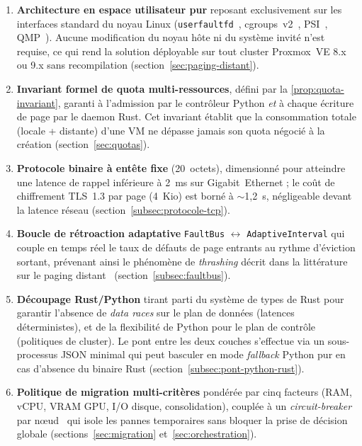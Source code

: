 \begin{enumerate}[label=\textbf{T\arabic*.}, leftmargin=*]
    \item \textbf{Architecture en espace utilisateur pur} reposant exclusivement sur les interfaces standard du noyau Linux (\texttt{userfaultfd}~\cite{userfaultfd_man}, cgroups~v2~\cite{cgroups_v2_doc}, PSI~\cite{psi_doc}, QMP~\cite{qemu_doc}). Aucune modification du noyau hôte ni du système invité n'est requise, ce qui rend la solution déployable sur tout cluster Proxmox~VE 8.x ou 9.x sans recompilation (section~\ref{sec:paging-distant}).

    \item \textbf{Invariant formel de quota multi-ressources}, défini par la \autoref{prop:quota-invariant}, garanti à l'admission par le contrôleur Python \emph{et} à chaque écriture de page par le daemon Rust. Cet invariant établit que la consommation totale (locale + distante) d'une VM ne dépasse jamais son quota négocié à la création (section~\ref{sec:quotas}).

    \item \textbf{Protocole binaire à entête fixe} (20~octets), dimensionné pour atteindre une latence de rappel inférieure à 2~ms sur Gigabit~Ethernet ; le coût de chiffrement TLS~1.3 par page (4~Kio) est borné à $\sim$1,2~\textmu{}s, négligeable devant la latence réseau (section~\ref{subsec:protocole-tcp}).

    \item \textbf{Boucle de rétroaction adaptative} \texttt{FaultBus} $\leftrightarrow$ \texttt{AdaptiveInterval} qui couple en temps réel le taux de défauts de page entrants au rythme d'éviction sortant, prévenant ainsi le phénomène de \textit{thrashing} décrit dans la littérature sur le paging distant~\cite{aguilera_2017_remote_memory} (section~\ref{subsec:faultbus}).

    \item \textbf{Découpage Rust/Python} tirant parti du système de types de Rust pour garantir l'absence de \textit{data races} sur le plan de données (latences déterministes), et de la flexibilité de Python pour le plan de contrôle (politiques de cluster). Le pont entre les deux couches s'effectue via un sous-processus JSON minimal qui peut basculer en mode \textit{fallback} Python pur en cas d'absence du binaire Rust (section~\ref{subsec:pont-python-rust}).

    \item \textbf{Politique de migration multi-critères} pondérée par cinq facteurs (RAM, vCPU, VRAM GPU, I/O disque, consolidation), couplée à un \emph{circuit-breaker} par nœud~\cite{nygard_release} qui isole les pannes temporaires sans bloquer la prise de décision globale (sections~\ref{sec:migration} et~\ref{sec:orchestration}).
\end{enumerate}

